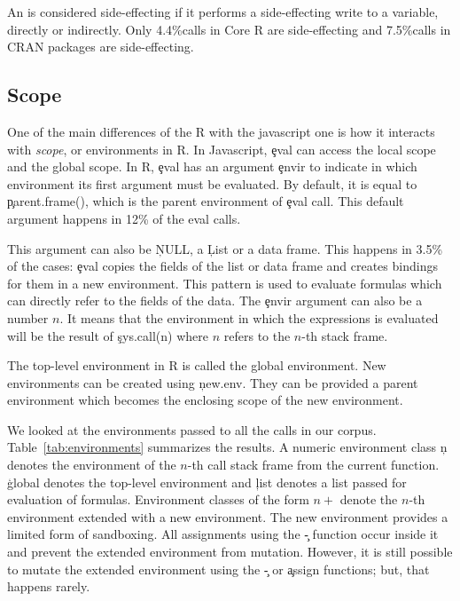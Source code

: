 \documentclass[conference]{IEEEtran}
\newcommand{\SideEffectingCoreCallPerc}{4.4\%\xspace}
\newcommand{\SideEffectingPackageCallPerc}{7.5\%\xspace}
\newcommand{\DefaultEnvirExprPercent}{12\%\xspace}
\begin{document}
An \eval is considered side-effecting if it performs a side-effecting write to a
variable, directly or indirectly. Only \SideEffectingCoreCallPerc \eval calls in
Core R are side-effecting and \SideEffectingPackageCallPerc \eval calls in CRAN
packages are side-effecting.

\subsection{Scope}

One of the main differences of the R \eval with the javascript one is how it
interacts with \emph{scope}, or environments in R. In Javascript, \c{eval} can
access the local scope and the global scope. In R, \c{eval} has an argument
\c{envir} to indicate in which environment its first argument must be evaluated.
By default, it is equal to \c{parent.frame()}, 
which is the parent environment of \c{eval} call. This default argument
happens in \DefaultEnvirExprPercent of the eval calls.

This argument can also be \c{NULL}, a \c{List} or a data frame. This happens
in 3.5\% of the cases: \c{eval} copies the fields of the list or data frame
and creates bindings for them in a new environment. This pattern is used to
evaluate formulas which can directly refer to the fields of the data.  The
\c{envir} argument can also be a number $n$. It means that the environment
in which the expressions is evaluated will be the result of \c{sys.call(n)}
where $n$ refers to the $n$-th stack frame.

The top-level environment in R is called the global environment. New
environments can be created using \c{new.env}. They can be provided a parent
environment which becomes the enclosing scope of the new environment.

We looked at the environments passed to all the \eval calls in our corpus.
Table~\ref{tab:environments} summarizes the results. A numeric environment
class \c{n} denotes the environment of the $n$-th call stack frame from the
current function. \c{global} denotes the top-level environment and \c{list}
denotes a list passed for evaluation of formulas. Environment classes of the
form $n+$ denote the $n$-th environment extended with a new environment. The
new environment provides a limited form of sandboxing. All assignments using
the \c{\<-} function occur inside it and prevent the extended environment
from mutation. However, it is still possible to mutate the extended
environment using the \c{\<\<-} or \c{assign} functions; but, that happens
rarely.
\end{document}
